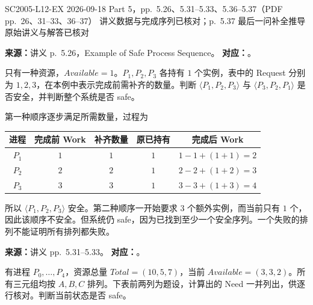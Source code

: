 

\examplemeta
  {SC2005-L12-EX}
  {2026-09-18}
  {Part 5，pp.~5.26、5.31--5.33、5.36--5.37（PDF pp.~26、31--33、36--37）}
  {讲义数据与完成序列已核对；p.~5.37 最后一问补全推导}
  {原始讲义与解答已核对}


\textbf{来源：}讲义 p.~5.26，Example of Safe Process Sequence。\quad
\textbf{对应：}。

只有一种资源，$Available=1$。$P_1,P_2,P_3$ 各持有 $1$ 个实例，表中的 Request 分别为 $1,2,3$，在本例中表示完成前需补齐的数量。判断 $\langle P_1,P_2,P_3\rangle$ 与 $\langle P_3,P_2,P_1\rangle$ 是否安全，并判断整个系统是否 safe。

\begin{checkedsolution}
第一种顺序逐步满足所需数量，过程为
\begin{center}
\begin{tabular}{@{}ccccc@{}}
  \toprule
  进程 & 完成前 Work & 补齐数量 & 原已持有 & 完成后 Work \\
  \midrule
  $P_1$ & $1$ & $1$ & $1$ & $1-1+(1+1)=2$ \\
  $P_2$ & $2$ & $2$ & $1$ & $2-2+(1+2)=3$ \\
  $P_3$ & $3$ & $3$ & $1$ & $3-3+(1+3)=4$ \\
  \bottomrule
\end{tabular}
\end{center}
所以 $\langle P_1,P_2,P_3\rangle$ 安全。第二种顺序一开始要求 $3$ 个额外实例，而当前只有 $1$ 个，因此该顺序不安全。但系统仍 safe，因为已找到至少一个安全序列。一个失败的排列不能证明所有排列都失败。
\end{checkedsolution}


\textbf{来源：}讲义 pp.~5.31--5.33。\quad
\textbf{对应：}。

有进程 $P_0,\ldots,P_4$，资源总量 $Total=(10,5,7)$，当前 $Available=(3,3,2)$。所有三元组均按 $A,B,C$ 排列。下表前两列为题设，计算出的 Need 一并列出，供逐行核对。判断当前状态是否 safe。

